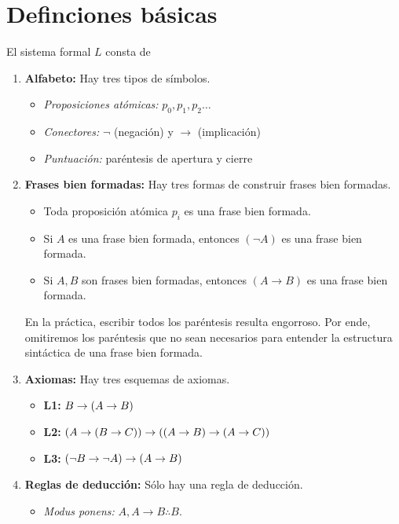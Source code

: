 \chapter{Definciones básicas}

\begin{definition}
El sistema formal $L$ consta de

\begin{enumerate}
    \item \textbf{Alfabeto:} Hay tres tipos de símbolos.
    \begin{itemize}
        \item \textit{Proposiciones atómicas:} $p_0, p_1, p_2 \dots$
        \item \textit{Conectores:} $\neg$ (negación) y $\to$ (implicación)
        \item \textit{Puntuación:} paréntesis de apertura y cierre
    \end{itemize}
    
    \item \textbf{Frases bien formadas:} Hay tres formas de construir frases bien formadas.
    \begin{itemize}
        \item Toda proposición atómica $p_i$ es una frase bien formada.
        \item Si $A$ es una frase bien formada, entonces $(\neg A)$ es una frase bien formada.
        \item Si $A,B$ son frases bien formadas, entonces $(A \to B)$ es una frase bien formada.
    \end{itemize}
    
    \begin{remark}
    En la práctica, escribir todos los paréntesis resulta engorroso. Por ende, omitiremos los paréntesis que no sean necesarios para entender la estructura sintáctica de una frase bien formada.
    \end{remark}
    
    \item \textbf{Axiomas:} Hay tres esquemas de axiomas.
    \begin{itemize}
        \item \textbf{L1:} $B \to (A \to B)$
        \item \textbf{L2:} $(A \to (B \to C)) \to ((A \to B) \to (A \to C))$
        \item \textbf{L3:} $(\neg B \to \neg A) \to (A \to B)$
    \end{itemize}
    
    \item \textbf{Reglas de deducción:} Sólo hay una regla de deducción.
    \begin{itemize}
        \item \textit{Modus ponens:} $A, A \to B \therefore B$.
    \end{itemize}
\end{enumerate}
\end{definition}

